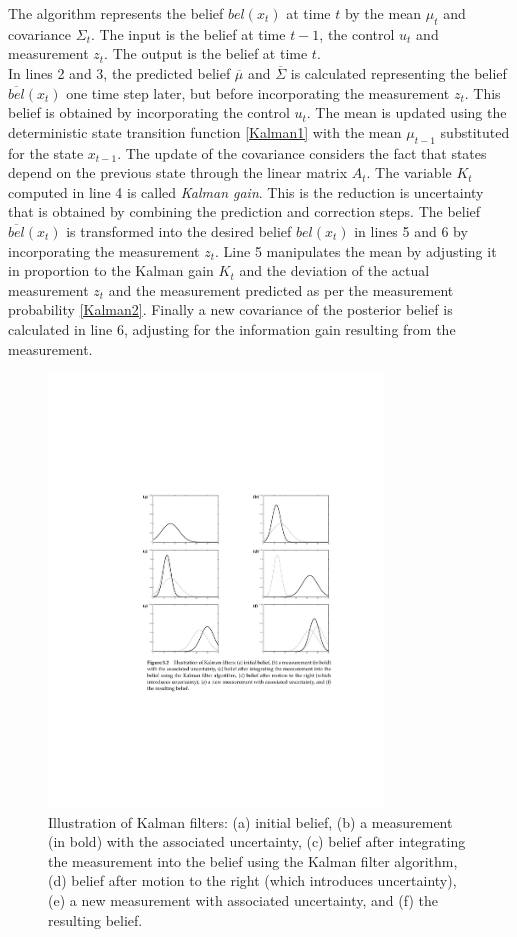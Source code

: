 \documentclass[conference]{IEEEtran}
\begin{document}
The algorithm represents the belief $bel(x_t)$ at time $t$ by the mean $\mu_t$ and covariance $\Sigma_t$. The input is the belief at time $t-1$, the control $u_t$ and measurement $z_t$. The output is the belief at time $t$.\\

In lines 2 and 3, the predicted belief $\overline \mu$ and $\overline \Sigma$ is calculated representing the belief $\overline{bel}(x_t)$ one time step later, but before incorporating the measurement $z_t$. This belief is obtained by incorporating the control $u_t$. The mean is updated using the deterministic state transition function \ref{Kalman1} with the mean $\mu_{t-1}$ substituted for the state $x_{t-1}$. The update of the covariance considers the fact that states depend on the previous state through the linear matrix $A_t$. The variable $K_t$ computed in line 4 is called \textit{Kalman gain}. This is the reduction is uncertainty that is obtained by combining the prediction and correction steps. The belief $\overline{bel}(x_t)$ is transformed into the desired belief ${bel}(x_t)$ in lines 5 and 6 by incorporating the measurement $z_t$. Line 5 manipulates the mean by adjusting it in proportion to the Kalman gain $K_t$ and the deviation of the actual measurement $z_t$ and the measurement predicted as per the measurement probability \ref{Kalman2}. Finally a new covariance of the posterior belief is calculated in line 6, adjusting for the information gain resulting from the measurement.\\

\begin{figure}[!t]
\centering
\includegraphics[width=3.5in]{./figures/KalmanIllustration.pdf}

\caption{Illustration of Kalman filters: (a) initial belief, (b) a measurement (in bold) with the associated uncertainty, (c) belief after integrating the measurement into the belief using the Kalman filter algorithm, (d) belief after motion to the right (which introduces uncertainty), (e) a new measurement with associated uncertainty, and (f) the resulting belief.}
\label{KalmanIllustration}
\end{figure}
\end{document}
